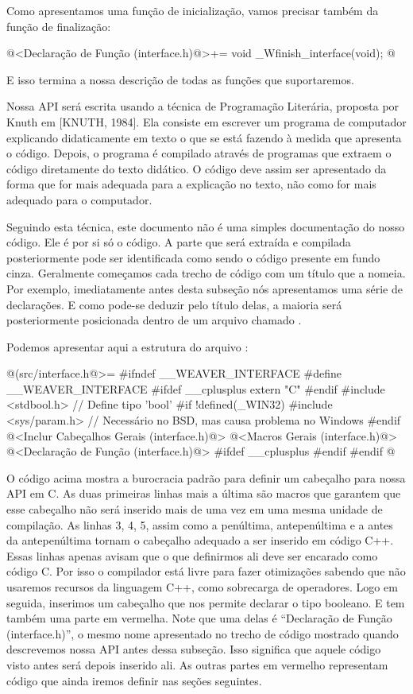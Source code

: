 Como apresentamos uma função de inicialização, vamos precisar também
da função de finalização:

\iniciocodigo
@<Declaração de Função (interface.h)@>+=
void _Wfinish_interface(void);
@
\fimcodigo

E isso termina a nossa descrição de todas as funções que suportaremos.


Nossa API será escrita usando a técnica de Programação Literária,
proposta por Knuth em [KNUTH, 1984]. Ela consiste em escrever um
programa de computador explicando didaticamente em texto o que se está
fazendo à medida que apresenta o código. Depois, o programa é
compilado através de programas que extraem o código diretamente do
texto didático. O código deve assim ser apresentado da forma que for
mais adequada para a explicação no texto, não como for mais adequado
para o computador.

Seguindo esta técnica, este documento não é uma simples documentação
do nosso código. Ele é por si só o código. A parte que será extraída e
compilada posteriormente pode ser identificada como sendo o código
presente em fundo cinza. Geralmente começamos cada trecho de código
com um título que a nomeia. Por exemplo, imediatamente antes desta
subseção nós apresentamos uma série de declarações. E como pode-se
deduzir pelo título delas, a maioria será posteriormente posicionada
dentro de um arquivo chamado .

Podemos apresentar aqui a estrutura do arquivo
:

\iniciocodigo
@(src/interface.h@>=
#ifndef __WEAVER_INTERFACE
#define __WEAVER_INTERFACE
#ifdef __cplusplus
extern "C" {
#endif
#include <stdbool.h> // Define tipo 'bool'
#if !defined(_WIN32)
#include <sys/param.h> // Necessário no BSD, mas causa problema no Windows
#endif
@<Inclur Cabeçalhos Gerais (interface.h)@>
@<Macros Gerais (interface.h)@>
@<Declaração de Função (interface.h)@>
#ifdef __cplusplus
}
#endif
#endif
@
\fimcodigo

O código acima mostra a burocracia padrão para definir um cabeçalho
para nossa API em C. As duas primeiras linhas mais a última são macros
que garantem que esse cabeçalho não será inserido mais de uma vez em
uma mesma unidade de compilação. As linhas 3, 4, 5, assim como a
penúltima, antepenúltima e a antes da antepenúltima tornam o cabeçalho
adequado a ser inserido em código C++. Essas linhas apenas avisam que
o que definirmos ali deve ser encarado como código C. Por isso o
compilador está livre para fazer otimizações sabendo que não usaremos
recursos da linguagem C++, como sobrecarga de operadores. Logo em
seguida, inserimos um cabeçalho que nos permite declarar o tipo
booleano. E tem também uma parte em vermelha. Note que uma delas é
``Declaração de Função (interface.h)'', o mesmo nome apresentado no trecho de
código mostrado quando descrevemos nossa API antes dessa
subseção. Isso significa que aquele código visto antes será depois
inserido ali. As outras partes em vermelho representam código que
ainda iremos definir nas seções seguintes.

